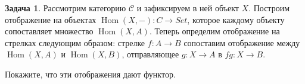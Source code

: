 \documentclass[10pt]{article}
\theoremstyle{definition}
\newtheorem{Pm}{Задача}[subsection]
\DeclareMathOperator{\dom}{dom}
\DeclareMathOperator{\cod}{cod}
\DeclareMathOperator{\Hom}{Hom}
\begin{document}
\begin{Pm}
    Рассмотрим категорию $\mathcal{C}$ и зафиксируем в ней объект $X$.
    Построим отображение на объектах $\Hom(X,-): C \to Set$, которое каждому объекту сопоставляет множество $\Hom(X, A)$.
    Теперь определим отображение на стрелках следующим образом: стрелке $f : A \to B$ сопоставим отображение между $\Hom(X,A)$ и $\Hom(X,B)$, отправляющее $g: X\to A$ в $fg : X \to B$.

    Покажите, что эти отображения дают функтор.
\end{Pm}
\end{document}
